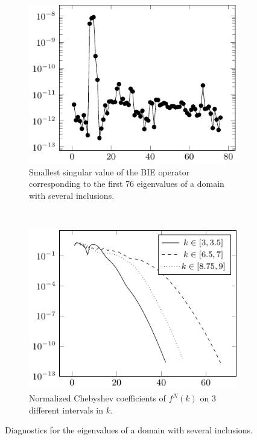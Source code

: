 \begin{figure}
  \centering
  \begin{subfigure}[t]{0.4\textwidth}
    \centering
    \includegraphics[width=\textwidth]{fig/ex_many_holes_004_sings_plot}
    \caption{Smallest singular value of the BIE operator
      corresponding to the first 76 eigenvalues of a
      domain with several inclusions.}
    \label{subfig:many_inclusions_sings}
  \end{subfigure}
  ~
  \begin{subfigure}[t]{0.4\textwidth}
    \centering
    \includegraphics[width=\textwidth]{fig/ex_many_holes_004_coeffs_plot}
    \caption{Normalized Chebyshev coefficients of $f^N(k)$ on
      3 different intervals in $k$.}
    \label{subfig:many_inclusions_coeffs}
  \end{subfigure}
  \caption{Diagnostics for the eigenvalues of a domain
    with several inclusions.}
  \label{fig:many_inclusions_diagnostics}
\end{figure}

